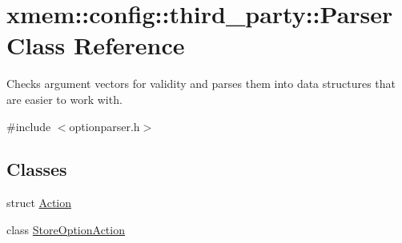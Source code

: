\hypertarget{classxmem_1_1config_1_1third__party_1_1_parser}{\section{xmem\-:\-:config\-:\-:third\-\_\-party\-:\-:Parser Class Reference}
\label{classxmem_1_1config_1_1third__party_1_1_parser}
}


Checks argument vectors for validity and parses them into data structures that are easier to work with.  




{\ttfamily \#include $<$optionparser.\-h$>$}

\subsection*{Classes}
\begin{DoxyCompactItemize}
\item 
struct \hyperlink{structxmem_1_1config_1_1third__party_1_1_parser_1_1_action}{Action}
\item 
class \hyperlink{classxmem_1_1config_1_1third__party_1_1_parser_1_1_store_option_action}{Store\-Option\-Action}
\end{DoxyCompactItemize}
